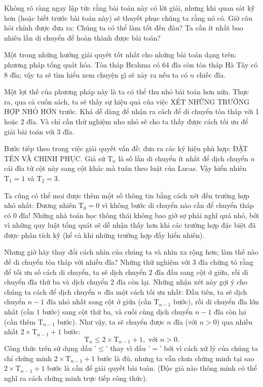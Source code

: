 Không rõ ràng ngay lập tức rằng bài toán này có lời giải, nhưng khi quan sát kỹ hơn (hoặc biết trước bài toán này) sẽ thuyết phục chúng ta rằng nó có. Giờ câu hỏi chính được đưa ra: Chúng ta có thể làm tốt đến đâu? Ta cần ít nhất bao nhiêu lần di chuyển để hoàn thành được bài toán?

Một trong những hướng giải quyết tốt nhất cho những bài toán dạng trên: phương pháp tổng quát hóa. Tòa tháp Brahma có $64$ đĩa còn tòa tháp Hà Tây có $8$ đĩa; vậy ta sẽ tìm hiểu xem chuyện gì sẽ xảy ra nếu ta có $n$ chiếc đĩa.

Một lợi thế của phương pháp này là ta có thể thu nhỏ bài toán hơn nữa. Thực ra, qua cả cuốn sách, ta sẽ thấy sự hiệu quả của việc XÉT NHỮNG TRƯỜNG HỢP NHỎ HƠN trước. Khá dễ dàng để nhận ra cách để di chuyển tòa tháp với 1 hoặc 2 đĩa. Và chỉ cần thử nghiệm nho nhỏ sẽ cho ta thấy được cách tối ưu để giải bài toán với 3 đĩa.

Bước tiếp theo trong việc giải quyết vấn đề: đưa ra các ký hiệu phù hợp: ĐẶT TÊN VÀ CHINH PHỤC. Giả sử $\mathrm{T}_n$ là số lần di chuyển ít nhất để dịch chuyển $n$ cái đĩa từ cột này sang cột khác mà tuân theo luật của Lucas. Vậy hiển nhiên $\mathrm{T}_1 = 1$ và $\mathrm{T}_2 = 3$.

Ta cũng có thể moi được thêm một số thông tin bằng cách xét đến trường hợp nhỏ nhất: Đương nhiên $\mathrm{T}_0 = 0$ vì không bước di chuyển nào cần để chuyển tháp có $0$ đĩa! Những nhà toán học thông thái không bao giờ sợ phải nghĩ quá nhỏ, bởi vì những quy luật tổng quát sẽ dễ nhận thấy hơn khi các trường hợp đặc biệt đã được phân tích kỹ (kể cả khi những trường hợp đấy hiển nhiên).

Nhưng giờ hãy thay đổi cách nhìn của chúng ta và nhìn xa rộng hơn; làm thế nào để di chuyển tòa tháp với nhiều đĩa? Những thử nghiệm với $3$ đĩa chứng tỏ rằng để tối ưu số cách di chuyển, ta sẽ dịch chuyển $2$ đĩa đầu sang cột ở giữa, rồi di chuyển đĩa thứ ba và dịch chuyển $2$ đĩa còn lại. Những nhận xét này gợi ý cho chúng ta cách để dịch chuyển $n$ đĩa một cách tối ưu nhất: Đầu tiên, ta sẽ dịch chuyển $n - 1$ đĩa nhỏ nhất sang cột ở giữa (cần $\mathrm{T}_{n - 1}$ bước), rồi di chuyển đĩa lớn nhất (cần $1$ bước) sang cột thứ ba, và cuối cùng dịch chuyển $n - 1$ đĩa còn lại (cần thêm $\mathrm{T}_{n - 1}$ bước). Như vậy, ta sẽ chuyển được $n$ đĩa (với $n > 0$) qua nhiều nhất $2 \times \mathrm{T}_{n - 1} + 1$ bước:
$$\mathrm{T}_n \le 2 \times \mathrm{T}_{n - 1} + 1, \text{ \ \ \ \ với } n > 0.$$
Công thức trên sử dụng dấu '$\le$' thay vì dấu '$=$' bởi vì cách xử lý của chúng ta chỉ chứng minh $2 \times \mathrm{T}_{n - 1} + 1$ bước là đủ, nhưng ta vẫn chưa chứng minh tại sao $2 \times \mathrm{T}_{n - 1} + 1$ bước là cần để giải quyết bài toán. (Độc giả nào thông minh có thể nghĩ ra cách chứng minh trực tiếp công thức).

